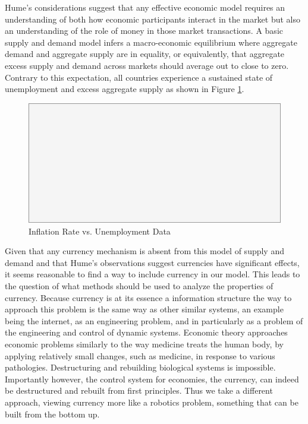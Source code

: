 Hume's considerations suggest that any effective economic model requires an understanding of both
how economic participants interact in the market but also an understanding of the role of money in
those market transactions. A basic supply and demand model infers a macro-economic equilibrium where
aggregate demand and aggregate supply are in equality, or equivalently, that aggregate excess supply
and demand across markets should average out to close to zero. Contrary to this expectation, all
countries experience a sustained state of unemployment and excess aggregate supply as shown in
Figure \ref{fig:ui_all_data}.

\begin{figure}[H]
\centering
\includegraphics[scale=0.48]{blank}
\caption{Inflation Rate vs. Unemployment Data}
\label{fig:ui_all_data}
\end{figure}

Given that any currency mechanism is absent from this model of supply and demand and that Hume's
observations suggest currencies have significant effects, it seems reasonable to find a way to
include currency in our model. This leads to the question of what methods should be used to analyze
the properties of currency. Because currency is at its essence a information structure the way to
approach this problem is the same way as other similar systems, an example being the internet, as an
engineering problem, and in particularly as a problem of the engineering and control of dynamic
systems. Economic theory approaches economic problems similarly to the way medicine treats the human
body, by applying relatively small changes, such as medicine, in response to various pathologies.
Destructuring and rebuilding biological systems is impossible. Importantly however, the control
system for economies, the currency, can indeed be destructured and rebuilt from first principles.
Thus we take a different approach, viewing currency more like a robotics problem, something that can
be built from the bottom up.

